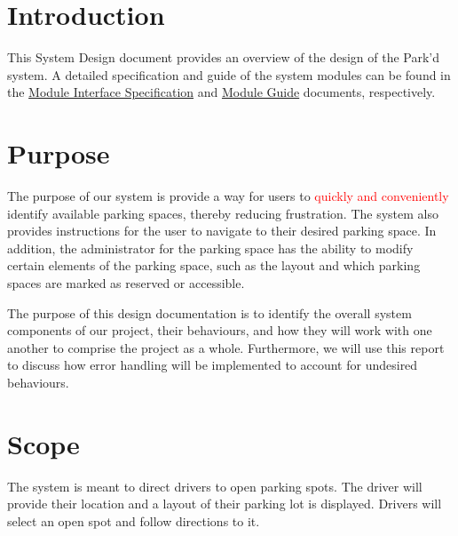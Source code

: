 \documentclass[12pt, titlepage]{article}
\begin{document}
\listoffigures

\newpage


\section{Introduction}

This System Design document provides an overview of the design of the Park'd
system. A detailed specification and guide of the system modules can be found in
the
\href{https://github.com/parkd-app/park-d/blob/main/docs/Design/SoftDetailedDes/MIS.pdf}{Module
Interface Specification} and
\href{https://github.com/parkd-app/park-d/blob/main/docs/Design/SoftArchitecture/MG.pdf}{Module
Guide} documents, respectively.

\section{Purpose}

The purpose of our system is provide a way for users to \textcolor{red}{quickly
and conveniently} identify available parking spaces,
thereby reducing frustration. The system also provides instructions for the user
to navigate to their desired parking space. In addition, the administrator for
the parking space has the ability to modify certain elements of the parking
space, such as the layout and which parking spaces are marked as reserved or
accessible.

The purpose of this design documentation is to identify the overall system
components of our project, their behaviours, and how they will work with one
another to comprise the project as a whole. Furthermore, we will use this report
to discuss how error handling will be implemented to account for undesired
behaviours.

\section{Scope}

The system is meant to direct drivers to open parking spots. The driver will
provide their location and a layout of their parking lot is displayed. Drivers
will select an open spot and follow directions to it.
\end{document}
